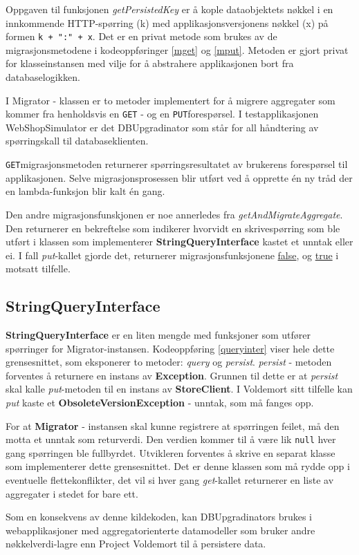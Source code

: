 

Oppgaven til funksjonen \emph{getPersistedKey} er å kople dataobjektets nøkkel i en innkommende HTTP-spørring (k) med applikasjonsversjonens nøkkel (x) på formen \texttt{k + ":" + x}. Det er en privat metode som brukes av de migrasjonsmetodene i kodeoppføringer \ref{mget} og \ref{mput}. Metoden er gjort privat for klasseinstansen med vilje for å abstrahere applikasjonen bort fra databaselogikken.

I Migrator - klassen er to metoder implementert for å migrere aggregater som kommer fra henholdsvis en \texttt{GET} - og en \texttt{PUT}\-forespørsel. I testapplikasjonen WebShopSimulator er det DBUpgradinator som står for all håndtering av spørringskall til databaseklienten.



\texttt{GET}\-migrasjonsmetoden returnerer spørringsresultatet av brukerens forespørsel til applikasjonen. Selve migrasjonsprosessen blir utført ved å opprette én ny tråd der en lambda-funksjon blir kalt én gang.



Den andre migrasjonsfunskjonen er noe annerledes fra \emph{getAndMigrateAggregate}. Den returnerer en bekreftelse som indikerer hvorvidt en skrivespørring som ble utført i klassen som implementerer \textbf{StringQueryInterface} kastet et unntak eller ei. I fall \emph{put}-kallet gjorde det, returnerer migrasjonsfunksjonene \underline{false}, og \underline{true} i motsatt tilfelle.

\subsection{StringQueryInterface}



\textbf{StringQueryInterface} er en liten mengde med funksjoner som utfører spørringer for Migrator-instansen. Kodeoppføring \ref{queryinter} viser hele dette grensesnittet, som eksponerer to metoder: \emph{query} og \emph{persist}. \emph{persist} - metoden forventes å returnere en instans av \textbf{Exception}. Grunnen til dette er at \emph{persist} skal kalle \emph{put}-metoden til en instans av \textbf{StoreClient}. I Voldemort sitt tilfelle kan \emph{put} kaste et \textbf{ObsoleteVersionException} - unntak, som må fanges opp. 

For at \textbf{Migrator} - instansen skal kunne registrere at spørringen feilet, må den motta et unntak som retur\-verdi. Den verdien kommer til å være lik \texttt{null} hver gang spørringen ble fullbyrdet. Utvikleren forventes å skrive en separat klasse som implementerer dette grensesnittet. Det er denne klassen som må rydde opp i eventuelle flettekonflikter, det vil si hver gang \emph{get}-kallet returnerer en liste av aggregater i stedet for bare ett.

Som en konsekvens av denne kildekoden, kan DBUpgradinators brukes i webapplikasjoner med aggregatorienterte datamodeller som bruker andre nøkkelverdi-lagre enn Project Voldemort til å persistere data.

